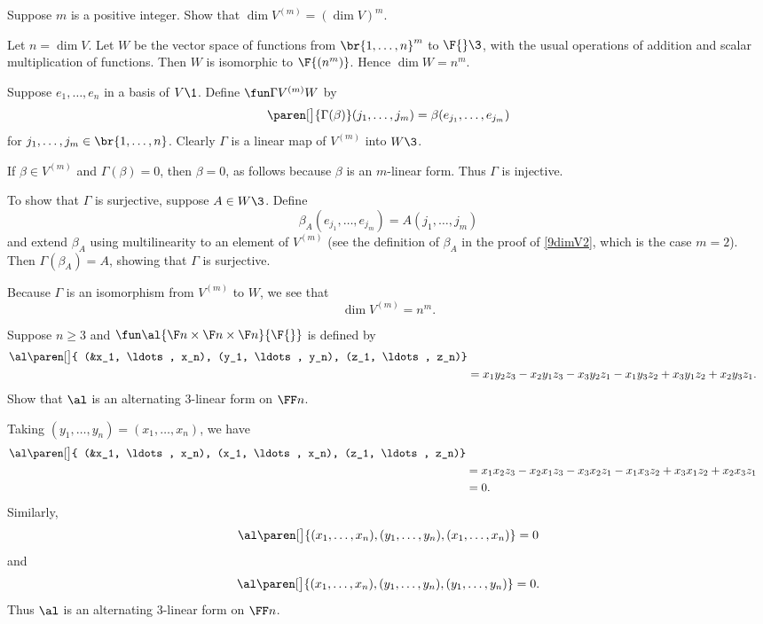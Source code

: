 
\exercise
Suppose $m$ is a positive integer. Show that $\dim V^{(m)} = (\dim V)^m\!$.

\begin{Solution}
Let $n = \dim V$. Let $W$ be the vector space of functions from $\br{1, \ldots, n}^m$ to $\F{}\3$, with the usual operations of addition and scalar multiplication of functions. Then $W$ is isomorphic to $\F {(n^m)}$. Hence $\dim W = n^m\!$.

Suppose $e_1, \ldots, e_n$ in a basis of $V\1$. Define $\fun \Gamma { V^{(m)} } W$ by
\[
\paren[\big]{\Gamma(\beta)}(j_1, \ldots, j_m) = \beta(e_{j_1}, \ldots, e_{j_m})
\]
for $ j_1, \ldots, j_m \in \br{1, \ldots, n}$. Clearly $\Gamma$ is a linear map of $V^{(m)}$ into $W\3$.

If $\beta \in V^{(m)}$ and $\Gamma(\beta) = 0$, then $\beta = 0$, as follows because $\beta$ is an $m$-linear form. Thus $\Gamma$ is injective.

To show that $\Gamma$ is surjective, suppose $A \in W\3$. Define
\[
\beta_A(e_{j_1}, \ldots, e_{j_m}) = A(j_1, \ldots, j_m)
\]
and extend $\beta_A$ using multilinearity to an element of $V^{(m)}$ (see the definition of $\beta_A$ in the proof of \ref{9dimV2}, which is the case $m=2$). Then $\Gamma(\beta_A) = A$, showing that $\Gamma$ is surjective.

Because $\Gamma$ is an isomorphism from $V^{(m)}$ to $W$, we see that
\[
\dim V^{(m)} = n^m\!.
\]
\end{Solution}

\exercise
Suppose $n \ge 3$ and $\fun \al {\F n \times \F n \times \F n} {\F{}}$ is defined by
\begin{align*}
\al\paren[\big]{ (&x_1, \ldots, x_n), (y_1, \ldots, y_n), (z_1, \ldots, z_n)} \\
&= x_1 y_2 z_3 - x_2 y_1 z_3 - x_3 y_2 z_1
-x_1 y_3 z_2 + x_3 y_1 z_2 + x_2 y_3 z_1.
\end{align*}
Show that $\al$ is an alternating $3$-linear form on $\FF n$.\label{9threelin}

\begin{Solution}
Taking $(y_1, \ldots, y_n) = (x_1, \ldots, x_n)$, we have
\begin{align*}
\al\paren[\big]{ (&x_1, \ldots, x_n), (x_1, \ldots, x_n), (z_1, \ldots, z_n)} \\
&= x_1 x_2 z_3 - x_2 x_1 z_3 - x_3 x_2 z_1
-x_1 x_3 z_2 + x_3 x_1 z_2 + x_2 x_3 z_1 \\
&= 0.
\end{align*}
Similarly,
\[
\al\paren[\big]{ (x_1, \ldots, x_n), (y_1, \ldots, y_n), (x_1, \ldots, x_n)} = 0
\]
and
\[
\al\paren[\big]{ (x_1, \ldots, x_n), (y_1, \ldots, y_n), (y_1, \ldots, y_n)} =0.
\]
Thus  $\al$ is an alternating $3$-linear form on $\FF n$.
\end{Solution}

